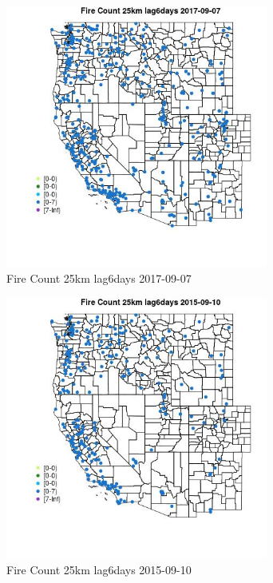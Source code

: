 \begin{figure} 
\centering  
\includegraphics[width=0.77\textwidth]{Code_Outputs/Report_ML_input_PM25_Step4_part_e_de_duplicated_aves_compiled_2019-05-21wNAs_MapObsFire_Count_25km_lag6days2017-09-07.jpg} 
\caption{\label{fig:Report_ML_input_PM25_Step4_part_e_de_duplicated_aves_compiled_2019-05-21wNAsMapObsFire_Count_25km_lag6days2017-09-07}Fire Count 25km lag6days 2017-09-07} 
\end{figure} 
 

\begin{figure} 
\centering  
\includegraphics[width=0.77\textwidth]{Code_Outputs/Report_ML_input_PM25_Step4_part_e_de_duplicated_aves_compiled_2019-05-21wNAs_MapObsFire_Count_25km_lag6days2015-09-10.jpg} 
\caption{\label{fig:Report_ML_input_PM25_Step4_part_e_de_duplicated_aves_compiled_2019-05-21wNAsMapObsFire_Count_25km_lag6days2015-09-10}Fire Count 25km lag6days 2015-09-10} 
\end{figure} 
 

